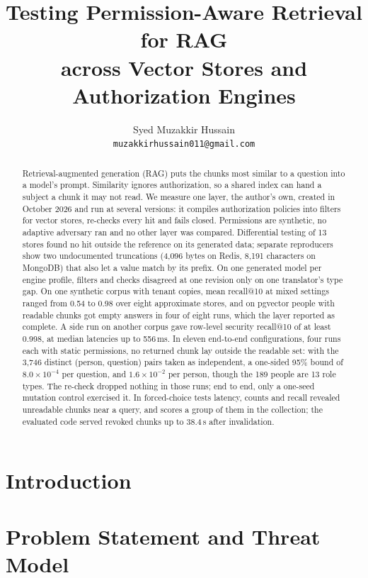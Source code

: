 \documentclass[11pt]{article}
\title{Testing Permission-Aware Retrieval for RAG\\across Vector Stores and Authorization Engines}
\author{Syed Muzakkir Hussain\\\texttt{muzakkirhussain011@gmail.com}}
\date{}
\begin{document}
\maketitle

\begin{abstract}
Retrieval-augmented generation (RAG) puts the chunks most similar to a question into a model's prompt.
Similarity ignores authorization, so a shared index can hand a subject a chunk it may not read. We measure one
layer, the author's own, created in October 2026 and run at several versions: it compiles authorization
policies into filters for vector stores, re-checks every hit and fails closed. Permissions are synthetic, no adaptive adversary ran and no other layer
was compared. Differential testing of 13 stores found no hit outside the reference on its generated data;
separate reproducers show two undocumented truncations (4,096 bytes on Redis, 8,191 characters on MongoDB) that
also let a value match by its prefix. On one generated model per engine profile, filters and checks disagreed
at one revision only on one translator's type gap. On one synthetic corpus with tenant copies, mean recall@10 at
mixed settings ranged from 0.54 to 0.98 over eight approximate stores, and on pgvector people with readable
chunks got empty answers in four of eight runs, which the layer reported as complete. A side run on another
corpus gave row-level security recall@10 of at least 0.998, at median latencies up to 556\,ms. In eleven
end-to-end configurations, four runs each with static permissions, no returned chunk lay outside the readable
set: with the 3,746 distinct (person, question) pairs taken as independent, a one-sided 95\% bound of
$8.0 \times 10^{-4}$ per question, and $1.6 \times 10^{-2}$ per person, though the 189 people are 13 role types.
The re-check dropped nothing in those runs; end to end, only a one-seed mutation control exercised it. In
forced-choice tests latency, counts and recall revealed unreadable chunks near a query, and scores a group of
them in the collection; the evaluated code served revoked chunks up to 38.4\,s after invalidation.
\end{abstract}

\section{Introduction}\label{sec:intro}


\section{Problem Statement and Threat Model}\label{sec:problem}

\end{document}
